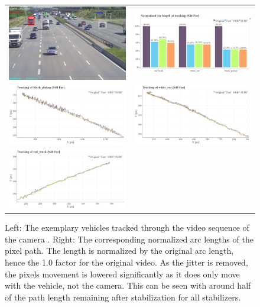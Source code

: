     



\begin{figure}[!ht]
  \centering
  \begin{tabular}{cc}
    \includegraphics[width=0.45\linewidth]{diagrams/object_tracking/s40_n_far/frame.png}    &  
    \includegraphics[width=0.475\linewidth]{diagrams/object_tracking/s40_n_far/arcs.png}    \\

    \includegraphics[width=0.475\linewidth]{diagrams/object_tracking/s40_n_far/black_pickup.png}    &  
    \includegraphics[width=0.475\linewidth]{diagrams/object_tracking/s40_n_far/white_car.png}    \\  
    \includegraphics[width=0.475\linewidth]{diagrams/object_tracking/s40_n_far/red_truck.png}   
  \end{tabular}
  \caption{Left: 
  The exemplary vehicles tracked through the video sequence of the camera . 
  Right:
  The corresponding normalized arc lengths of the pixel path. 
  The length is normalized by the original arc length, hence the 1.0 factor for the original video. 
  As the jitter is removed, the pixels movement is lowered significantly as it does only move with the vehicle, not the camera.
  This can be seen with around half of the path length remaining after stabilization for all stabilizers.
  }
  \label{fig:object_tracking_appendix_s40_n_far}
\end{figure}



